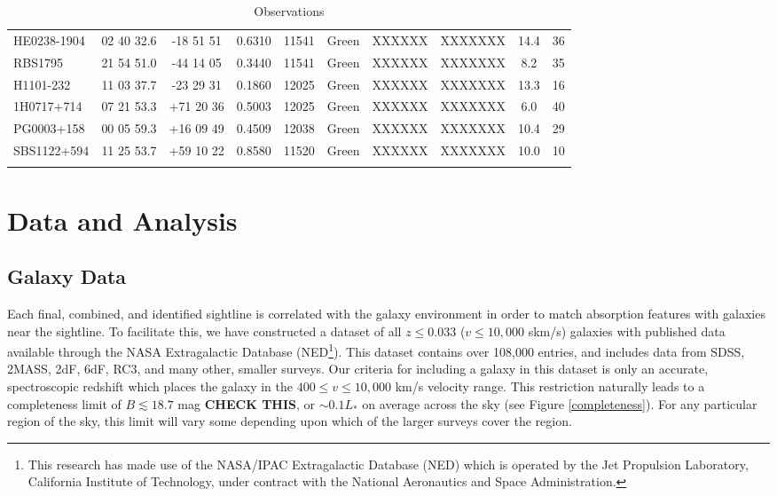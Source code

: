 \documentclass[iop]{emulateapj-rtx4}
\begin{document}
\begin{table}[ht]
\begin{center}
\begin{tabular}{l c c c c c c c c c}
 HE0238-1904 				& 02 40 32.6  &  -18 51 51   &  0.6310 & 11541 & Green	     & XXXXXX & XXXXXXX  &   14.4 &  36  \\
 RBS1795 				& 21 54 51.0  &  -44 14 05   &  0.3440 & 11541	 & Green	     & XXXXXX & XXXXXXX  &     8.2 &  35  \\
 H1101-232 				& 11 03 37.7  &  -23 29 31   &  0.1860 & 12025 & Green  	     & XXXXXX & XXXXXXX  &   13.3 &  16  \\
 1H0717+714 				& 07 21 53.3  &  +71 20 36  &  0.5003 & 12025	 & Green	     & XXXXXX & XXXXXXX  &     6.0 &  40  \\
 PG0003+158 				& 00 05 59.3  &  +16 09 49  &  0.4509 & 12038 & Green	     & XXXXXX & XXXXXXX  &   10.4 &  29  \\
 SBS1122+594 			& 11 25 53.7  &  +59 10 22  &  0.8580 & 11520	 & Green	     & XXXXXX & XXXXXXX  &   10.0 &  10  \\
 \\
\hline

\end{tabular}
\end{center}
  \caption{\small{Observations}}
  \label{target_table}
\end{table}

\section{Data and Analysis}

\subsection{Galaxy Data}
Each final, combined, and identified sightline is correlated with the galaxy environment in order to match absorption features with galaxies near the sightline. To facilitate this, we have constructed a dataset of all $z\leq 0.033$ ($v\leq 10,000$ skm/s) galaxies with published data available through the NASA Extragalactic Database (NED\footnote{This research has made use of the NASA/IPAC Extragalactic Database (NED) which is operated by the Jet Propulsion Laboratory, California Institute of Technology, under contract with the National Aeronautics and Space Administration.}). This dataset contains over 108,000 entries, and includes data from SDSS, 2MASS, 2dF, 6dF, RC3, and many other, smaller surveys. Our criteria for including a galaxy in this dataset is only an accurate, spectroscopic redshift which places the galaxy in the $400 \leq v \leq 10,000$ km/s velocity range. This restriction naturally leads to a completeness limit of $B \lesssim 18.7$ mag \textbf{CHECK THIS}, or $\sim0.1 L_*$ on average across the sky (see Figure \ref{completeness}). For any particular region of the sky, this limit will vary some depending upon which of the larger surveys cover the region. 
\end{document}
